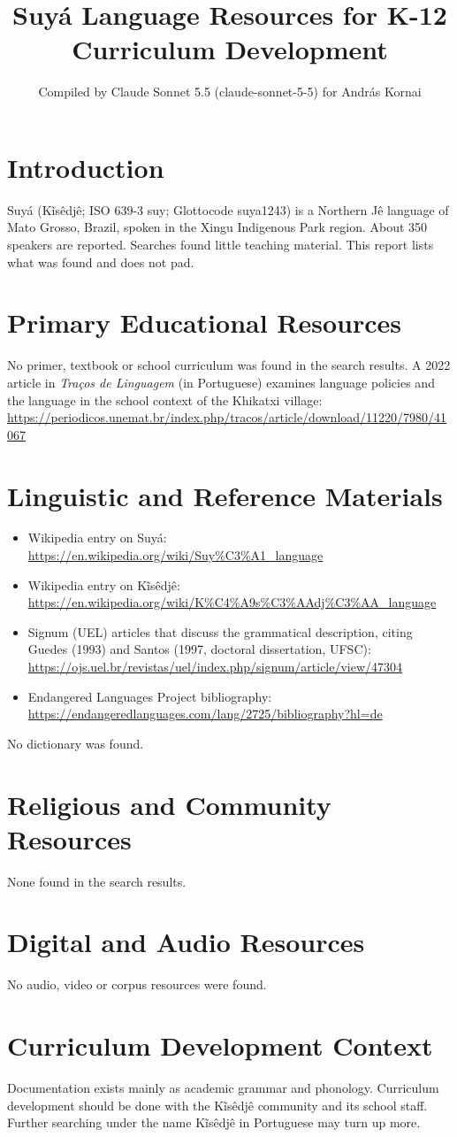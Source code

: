 \documentclass[12pt]{article}
\title{Suy\'a Language Resources for K-12 Curriculum Development}
\author{Compiled by Claude Sonnet 5.5 (claude-sonnet-5-5) for Andr\'as Kornai}
\date{}
\begin{document}
\maketitle

\section{Introduction}
Suy\'a (Kĩs\^edj\^e; ISO 639-3 suy; Glottocode suya1243) is a Northern J\^e language of Mato Grosso, Brazil, spoken in the Xingu Indigenous Park region. About 350 speakers are reported. Searches found little teaching material. This report lists what was found and does not pad.

\section{Primary Educational Resources}
No primer, textbook or school curriculum was found in the search results. A 2022 article in \emph{Tra\c{c}os de Linguagem} (in Portuguese) examines language policies and the language in the school context of the Khikatxi village: \url{https://periodicos.unemat.br/index.php/tracos/article/download/11220/7980/41067}

\section{Linguistic and Reference Materials}
\begin{itemize}
\item Wikipedia entry on Suy\'a: \url{https://en.wikipedia.org/wiki/Suy%C3%A1_language}
\item Wikipedia entry on Kĩs\^edj\^e: \url{https://en.wikipedia.org/wiki/K%C4%A9s%C3%AAdj%C3%AA_language}
\item Signum (UEL) articles that discuss the grammatical description, citing Guedes (1993) and Santos (1997, doctoral dissertation, UFSC): \url{https://ojs.uel.br/revistas/uel/index.php/signum/article/view/47304}
\item Endangered Languages Project bibliography: \url{https://endangeredlanguages.com/lang/2725/bibliography?hl=de}
\end{itemize}
No dictionary was found.

\section{Religious and Community Resources}
None found in the search results.

\section{Digital and Audio Resources}
No audio, video or corpus resources were found.

\section{Curriculum Development Context}
Documentation exists mainly as academic grammar and phonology. Curriculum development should be done with the Kĩs\^edj\^e community and its school staff. Further searching under the name Kĩs\^edj\^e in Portuguese may turn up more.
\end{document}
